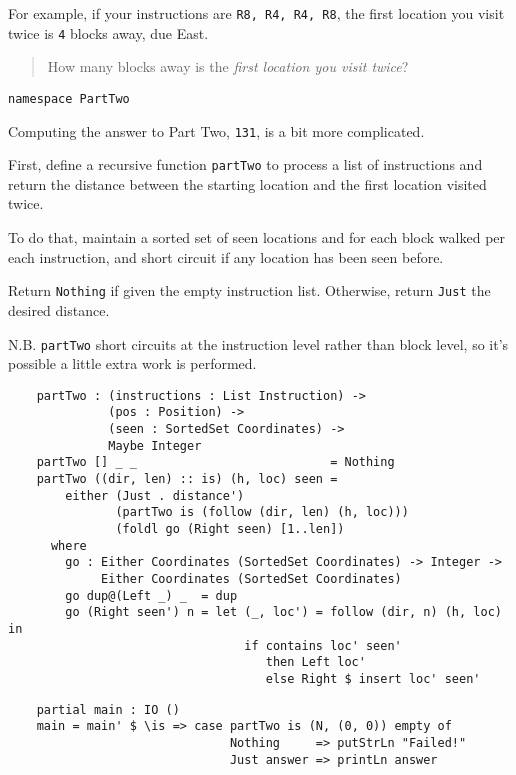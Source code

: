 For example, if your instructions are
\texttt{R8, R4, R4, R8}, the first location you visit twice
is \texttt{4} blocks away, due East.

\begin{quote}
  How many blocks away is the \textit{first location you visit twice}?
\end{quote}

\begin{verbatim}
namespace PartTwo
\end{verbatim}

Computing the answer to Part Two, \texttt{131}, is a bit
more complicated.

First, define a recursive function \texttt{partTwo} to
process a list of instructions and return the distance between the
starting location and the first location visited twice.

To do that, maintain a sorted set of seen locations and for each block
walked per each instruction, and short circuit if any location has been
seen before.

Return \texttt{Nothing} if given the empty instruction
list. Otherwise, return \texttt{Just} the desired distance.

N.B. \texttt{partTwo} short circuits at the instruction
level rather than block level, so it's possible a little extra work is
performed.

\begin{verbatim}
    partTwo : (instructions : List Instruction) ->
              (pos : Position) ->
              (seen : SortedSet Coordinates) ->
              Maybe Integer
    partTwo [] _ _                           = Nothing
    partTwo ((dir, len) :: is) (h, loc) seen =
        either (Just . distance')
               (partTwo is (follow (dir, len) (h, loc)))
               (foldl go (Right seen) [1..len])
      where
        go : Either Coordinates (SortedSet Coordinates) -> Integer ->
             Either Coordinates (SortedSet Coordinates)
        go dup@(Left _) _  = dup
        go (Right seen') n = let (_, loc') = follow (dir, n) (h, loc) in
                                 if contains loc' seen'
                                    then Left loc'
                                    else Right $ insert loc' seen'
\end{verbatim}

\begin{verbatim}
    partial main : IO ()
    main = main' $ \is => case partTwo is (N, (0, 0)) empty of
                               Nothing     => putStrLn "Failed!"
                               Just answer => printLn answer
\end{verbatim}

